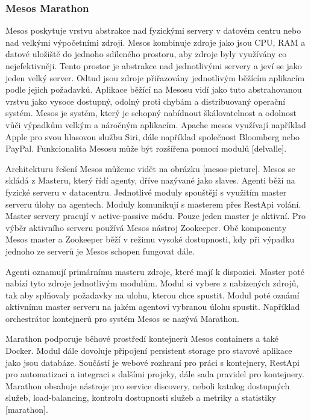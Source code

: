 \subsubsection{Mesos Marathon}
Mesos poskytuje vrstvu abstrakce nad fyzickými servery v datovém centru nebo nad velkými výpočetními zdroji. Mesos kombinuje zdroje jako jsou CPU, RAM a datové uložiště do jednoho sdíleného prostoru, aby zdroje byly využívány co nejefektivněji. Tento prostor je abstrakce nad jednotlivými servery a jeví se jako jeden velký server. Odtud jsou zdroje přiřazovány jednotlivým běžícím aplikacím podle jejich požadavků. Aplikace běžící na Mesosu vidí jako tuto abstrahovanou vrstvu jako vysoce dostupný,  odolný proti chybám a distribuovaný operační systém. Mesos je systém, který je schopný nabídnout škálovatelnost a odolnost vůči výpadkům velkým a náročným aplikacím. Apache mesos využívají například Apple pro svou hlasovou službu Siri, dále například společnost Bloomberg nebo PayPal. Funkcionalita Mesosu může být rozšířena pomocí modulů [delvalle]. \par
    Architekturu řešení Mesos můžeme vidět na obrázku [mesos-picture]. Mesos se skládá z Masteru, který řídí agenty, dříve nazývané jako slaves. Agenti běží na fyzické serveru v datacentru. Jednotlivé moduly spouštějí s využitím master serveru úlohy na agentech. Moduly komunikují s masterem přes RestApi volání. Master servery pracují v active-passive módu. Pouze jeden master je aktivní. Pro výběr aktivního serveru používá Mesos nástroj Zookeeper. Obě komponenty Mesos master a Zookeeper běží v režimu vysoké dostupnosti, kdy při výpadku jednoho ze serverů je Mesos schopen fungovat dále. \par
	Agenti oznamují primárnímu masteru zdroje, které mají k dispozici. Master poté nabízí tyto zdroje jednotlivým modulům. Modul si vybere z nabízených zdrojů, tak aby splňovaly požadavky na ulohu, kterou chce spustit. Modul poté oznámí aktivnímu master serveru na jakém agentovi vybranou úlohu spustit. Například orchestrátor kontejnerů pro systém Mesos se nazývá Marathon.\par
	Marathon podporuje běhové prostředí kontejnerů Mesos containers a také Docker. Modul dále dovoluje připojení persistent storage pro stavové aplikace jako jsou databáze. Součástí je webové rozhraní pro práci s kontejnery, RestApi pro automatizaci a integraci s dalšími projeky, dále sada pravidel pro kontejnery. Marathon obsahuje nástroje pro service discovery, neboli katalog dostupných služeb, load-balancing, kontrolu dostupnosti služeb a metriky a statistiky [marathon].

